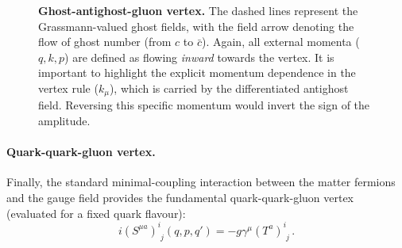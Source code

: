 \begin{figure}[H]
    \centering
    \begin{minipage}{0.45\textwidth}
        \centering
    \end{minipage}
    \hfill
    \begin{minipage}{0.5\textwidth}
        \caption{\textbf{Ghost-antighost-gluon vertex.} The dashed lines represent the Grassmann-valued ghost fields, with the field arrow denoting the flow of ghost number (from $c$ to $\bar{c}$). Again, all external momenta ($q, k, p$) are defined as flowing \textit{inward} towards the vertex. It is important to highlight the explicit momentum dependence in the vertex rule (\(k_\mu\)), which is carried by the differentiated antighost field. Reversing this specific momentum would invert the sign of the amplitude.}
        \label{fig:ghost_gluon_vertex_detail}
    \end{minipage}
\end{figure}

\paragraph{Quark-quark-gluon vertex.}
Finally, the standard minimal-coupling interaction between the matter fermions and the gauge field provides the fundamental quark-quark-gluon vertex (evaluated for a fixed quark flavour):
\begin{equation} \label{eq:quark_gluon_vertex}
    i(S^{\mu a})^i_{\phantom{i}j}(q, p, q') = -g \gamma^\mu (T^a)^i_{\phantom{i}j} \, .
\end{equation}


